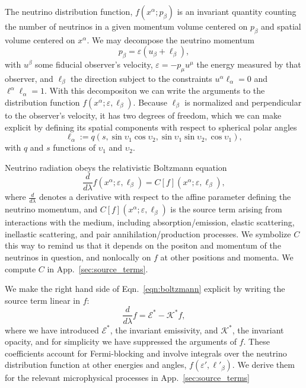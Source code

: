 \documentclass[aps,prd,twocolumn,superscriptaddress,groupedaddress]{revtex4}
\begin{document}
The neutrino distribution function, $f(x^\alpha; p_\beta)$ is an invariant
quantity counting the number of neutrinos in a given momentum volume centered on
$p_\beta$ and spatial volume centered on $x^\alpha$.
We may decompose the neutrino momentum
\begin{equation}
  \label{eqn:def_momentum}
  p_\beta = \varepsilon (u_\beta + \ell_\beta),
\end{equation}
with $u^\beta$ some fiducial observer's velocity,
$\varepsilon=-p_\mu u^\mu$ the energy measured by that observer,
and $\ell_\beta$ the direction subject to the constraints
$u^\alpha \ell_\alpha = 0$ and
$\ell^\alpha \ell_\alpha=1$.
With this decompositon we can write the arguments to the distribution function
$f(x^\alpha;\varepsilon,\ell_\beta)$.
Because $\ell_\beta$ is normalized and perpendicular to the observer's velocity,
it has two degrees of freedom, which we can make explicit by defining its
spatial components with respect to spherical polar angles
\begin{equation}
  \label{eq:def_direction}
  \ell_\alpha :=
  q (s,\sin\upsilon_1\cos\upsilon_2,\sin\upsilon_1\sin\upsilon_2,\cos\upsilon_1),
\end{equation}
with $q$ and $s$ functions of $\upsilon_1$ and $\upsilon_2$.

Neutrino radiation obeys the relativistic Boltzmann equation
\begin{equation}
  \label{eqn:boltzmann}
  \frac{d}{d\lambda}f(x^\alpha;\varepsilon,\ell_\beta) =
  C[f](x^\alpha;\varepsilon,\ell_\beta),
\end{equation}
where $\frac{d}{d\lambda}$ denotes a derivative with respect to the affine
parameter defining the neutrino momentum,
and $C[f](x^\alpha;\varepsilon,\ell_\beta)$
is the source term arising from interactions with the medium,
including absorption/emission, elastic scattering, inellastic scattering,
and pair annihilation/production processes.
We symbolize $C$ this way to remind us that it depends on the positon and
momentum of the neutrinos in question, and nonlocally on $f$ at other positions
and momenta.
We compute $C$ in App.~\ref{sec:source_terms}.

We make the right hand side of Eqn.~\ref{eqn:boltzmann} explicit by writing
the source term linear in $f$:
\begin{equation}
  \label{eqn:boltzmann_linear}
  \frac{d}{d\lambda}f =
  \mathscr{E}^* - \mathscr{K}^* f,
\end{equation}
where we have introduced
$\mathscr{E}^*$, the invariant emissivity, and
$\mathscr{K}^*$, the invariant opacity, and for simplicity we have suppressed
the arguments of $f$.
These coefficients account for Fermi-blocking and involve integrals over the
neutrino distribution function at other energies and angles,
$f(\varepsilon', \ell'_\beta)$.
We derive them for the relevant microphysical processes in
App.~\ref{sec:source_terms}
\end{document}
